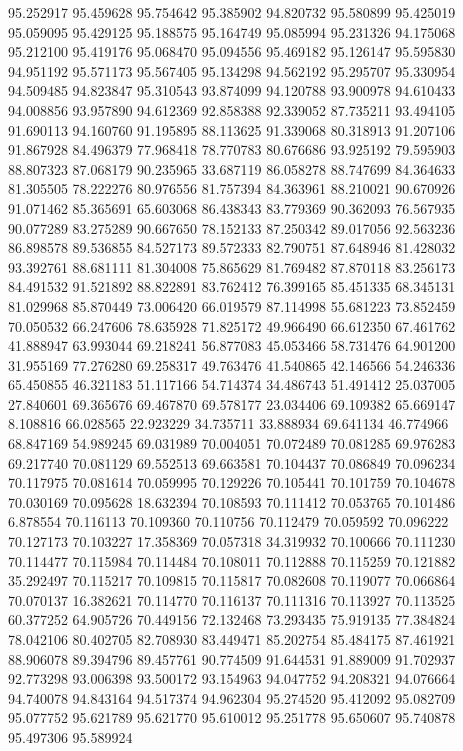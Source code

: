 95.252917
95.459628
95.754642
95.385902
94.820732
95.580899
95.425019
95.059095
95.429125
95.188575
95.164749
95.085994
95.231326
94.175068
95.212100
95.419176
95.068470
95.094556
95.469182
95.126147
95.595830
94.951192
95.571173
95.567405
95.134298
94.562192
95.295707
95.330954
94.509485
94.823847
95.310543
93.874099
94.120788
93.900978
94.610433
94.008856
93.957890
94.612369
92.858388
92.339052
87.735211
93.494105
91.690113
94.160760
91.195895
88.113625
91.339068
80.318913
91.207106
91.867928
84.496379
77.968418
78.770783
80.676686
93.925192
79.595903
88.807323
87.068179
90.235965
33.687119
86.058278
88.747699
84.364633
81.305505
78.222276
80.976556
81.757394
84.363961
88.210021
90.670926
91.071462
85.365691
65.603068
86.438343
83.779369
90.362093
76.567935
90.077289
83.275289
90.667650
78.152133
87.250342
89.017056
92.563236
86.898578
89.536855
84.527173
89.572333
82.790751
87.648946
81.428032
93.392761
88.681111
81.304008
75.865629
81.769482
87.870118
83.256173
84.491532
91.521892
88.822891
83.762412
76.399165
85.451335
68.345131
81.029968
85.870449
73.006420
66.019579
87.114998
55.681223
73.852459
70.050532
66.247606
78.635928
71.825172
49.966490
66.612350
67.461762
41.888947
63.993044
69.218241
56.877083
45.053466
58.731476
64.901200
31.955169
77.276280
69.258317
49.763476
41.540865
42.146566
54.246336
65.450855
46.321183
51.117166
54.714374
34.486743
51.491412
25.037005
27.840601
69.365676
69.467870
69.578177
23.034406
69.109382
65.669147
8.108816
66.028565
22.923229
34.735711
33.888934
69.641134
46.774966
68.847169
54.989245
69.031989
70.004051
70.072489
70.081285
69.976283
69.217740
70.081129
69.552513
69.663581
70.104437
70.086849
70.096234
70.117975
70.081614
70.059995
70.129226
70.105441
70.101759
70.104678
70.030169
70.095628
18.632394
70.108593
70.111412
70.053765
70.101486
6.878554
70.116113
70.109360
70.110756
70.112479
70.059592
70.096222
70.127173
70.103227
17.358369
70.057318
34.319932
70.100666
70.111230
70.114477
70.115984
70.114484
70.108011
70.112888
70.115259
70.121882
35.292497
70.115217
70.109815
70.115817
70.082608
70.119077
70.066864
70.070137
16.382621
70.114770
70.116137
70.111316
70.113927
70.113525
60.377252
64.905726
70.449156
72.132468
73.293435
75.919135
77.384824
78.042106
80.402705
82.708930
83.449471
85.202754
85.484175
87.461921
88.906078
89.394796
89.457761
90.774509
91.644531
91.889009
91.702937
92.773298
93.006398
93.500172
93.154963
94.047752
94.208321
94.076664
94.740078
94.843164
94.517374
94.962304
95.274520
95.412092
95.082709
95.077752
95.621789
95.621770
95.610012
95.251778
95.650607
95.740878
95.497306
95.589924
